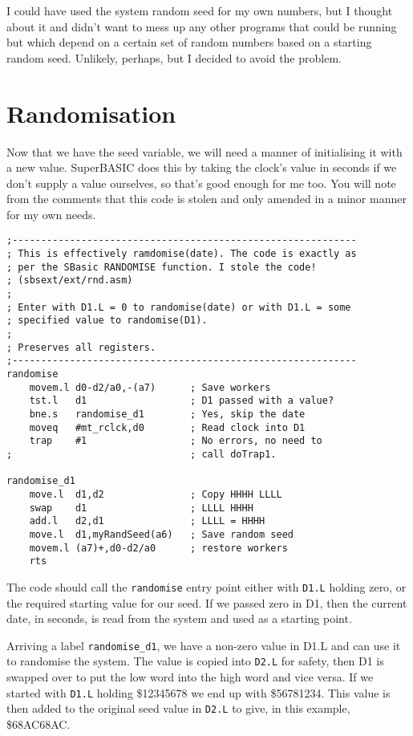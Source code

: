 I could have used the system random seed for my own numbers, but I
thought about it and didn't want to mess up any other programs that
could be running but which depend on a certain set of random numbers
based on a starting random seed. Unlikely, perhaps, but I decided
to avoid the problem.

\section{Randomisation}

Now that we have the seed variable, we will need a manner of initialising
it with a new value. SuperBASIC does this by taking the clock's value
in seconds if we don't supply a value ourselves, so that's good enough
for me too. You will note from the comments that this code is stolen
and only amended in a minor manner for my own needs.

\begin{lstlisting}[caption={Randomise function},firstnumber=24]
;------------------------------------------------------------
; This is effectively ramdomise(date). The code is exactly as
; per the SBasic RANDOMISE function. I stole the code! 
; (sbsext/ext/rnd.asm)
;
; Enter with D1.L = 0 to randomise(date) or with D1.L = some
; specified value to randomise(D1).
;
; Preserves all registers.
;------------------------------------------------------------
randomise
    movem.l d0-d2/a0,-(a7)      ; Save workers
    tst.l   d1                  ; D1 passed with a value?
    bne.s   randomise_d1        ; Yes, skip the date
    moveq   #mt_rclck,d0        ; Read clock into D1
    trap    #1                  ; No errors, no need to
;                               ; call doTrap1.

randomise_d1
    move.l  d1,d2               ; Copy HHHH LLLL
    swap    d1                  ; LLLL HHHH
    add.l   d2,d1               ; LLLL = HHHH
    move.l  d1,myRandSeed(a6)   ; Save random seed
    movem.l (a7)+,d0-d2/a0      ; restore workers
    rts

\end{lstlisting}

The code should call the \lstinline!randomise! entry point either
with \lstinline!D1.L! holding zero, or the required starting value
for our seed. If we passed zero in D1, then the current date, in seconds,
is read from the system and used as a starting point.

Arriving a label \lstinline!randomise_d1!, we have a non-zero value
in D1.L and can use it to randomise the system. The value is copied
into \lstinline!D2.L! for safety, then D1 is swapped over to put
the low word into the high word and vice versa. If we started with
\lstinline!D1.L! holding \$12345678 we end up with \$56781234. This
value is then added to the original seed value in \lstinline!D2.L!
to give, in this example, \$68AC68AC.

